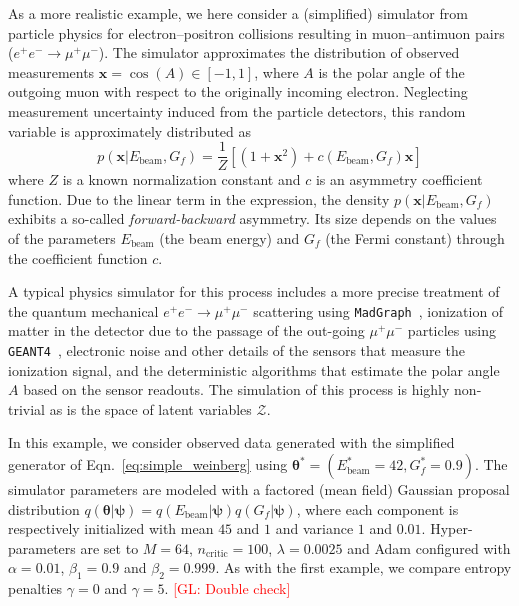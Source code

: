 \documentclass{article}
\newcommand{\glnote}[1]{\textcolor{red}{[GL: #1]}}
\newcommand{\bftheta}{{\bm \theta}}
\newcommand{\bfpsi}{{\bm \psi}}
\theoremstyle{plain}
\begin{document}
As a more realistic example, we here consider a (simplified) simulator from
particle physics for electron--positron collisions resulting in muon--antimuon
pairs ($e^+e^- \rightarrow \mu^+\mu^-$). The simulator approximates the
distribution of observed measurements $\mathbf{x} = \cos(A) \in [-1,1]$, where $A$ is the
polar angle of the outgoing muon with respect  to the originally incoming
electron. Neglecting measurement uncertainty induced from the particle detectors,
this random variable is approximately distributed as
\begin{equation}\label{eq:simple_weinberg}
p(\mathbf{x}|E_\text{beam}, G_f) = \frac{1}{Z} \left[ (1 + \mathbf{x}^2) + c(E_\text{beam}, G_f) \mathbf{x} \right]
\end{equation}
where $Z$ is a known normalization constant and $c$ is an asymmetry coefficient
function. Due to the linear term in the expression, the density $p(\mathbf{x} |
E_\text{beam}, G_f)$ exhibits a so-called {\it forward-backward} asymmetry.  Its
size depends on the values of the parameters $E_\text{beam}$ (the beam energy)
and $G_f$ (the Fermi constant) through the coefficient function $c$.

A typical physics simulator for this process includes a more precise treatment of the
quantum mechanical  $e^+e^- \rightarrow \mu^+\mu^-$ scattering
using \texttt{MadGraph}~\cite{Alwall:2011uj},  ionization of matter in the
detector due to the passage of the out-going $\mu^+\mu^-$ particles using
\texttt{GEANT4}~\cite{Agostinelli:2002hh}, electronic noise and other details of the sensors
that measure the ionization signal, and the deterministic algorithms that
estimate the polar angle $A$ based on the sensor readouts. The simulation of
this process is highly non-trivial as is the space of latent variables $\mathcal{Z}$.

In this example, we consider observed data generated with the simplified generator of Eqn.~\ref{eq:simple_weinberg}
using $\bftheta^* = (E_\text{beam}^*=42, G_f^*=0.9)$. The simulator parameters are modeled with a
factored (mean field) Gaussian proposal distribution $q(\bftheta|\bfpsi) = q(E_\text{beam}|\bfpsi)
q(G_f|\bfpsi)$, where each component is respectively initialized with mean $45$
and $1$ and variance $1$ and $0.01$. Hyper-parameters are set to $M=64$,
$n_\text{critic}=100$, $\lambda=0.0025$ and Adam configured with $\alpha=0.01$,
$\beta_1=0.9$ and $\beta_2=0.999$. As with the first example, we compare
entropy penalties $\gamma=0$ and $\gamma=5$. \glnote{Double check}
\end{document}
